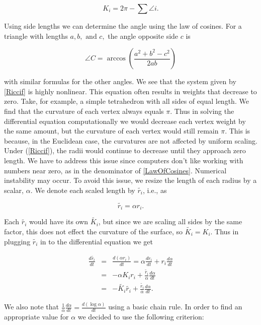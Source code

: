 \documentclass[12pt]{article}
\begin{document}
\begin{equation}
K_i = 2\pi - \sum{\angle i}.
\end{equation}

Using side lengths we can determine the angle using the law of cosines. For a triangle with lengths $a, b,\mbox{ and }c,$ the angle opposite side $c$ is
  
  \begin{equation}
  \label{LawOfCosines}
  \angle C = \arccos(\frac{a^2 + b^2 - c^2}{2ab})
  \end{equation}
  
 with similar formulas for the other angles. We see that the system given by \ref{Riccif} is highly nonlinear. This equation often results in weights that decrease to zero. Take, for example, a simple tetrahedron with all sides of equal length. We find that the curvature of each vertex always equals $\pi$. Thus in solving the differential equation computationally we would decrease each vertex weight by the same amount, but the curvature of each vertex would still remain $\pi.$ This is because, in the Euclidean case, the curvatures are not affected by uniform scaling. Under (\ref{Riccif}), the radii would continue to decrease until they approach zero length. We have to address this issue since computers don't like working with numbers near zero, as in the denominator of \ref{LawOfCosines}. Numerical instability may occur. To avoid this issue, we resize the length of each radius by a scalar, $\alpha$. We denote each scaled length by $\tilde{r_i}$, i.e., as
 
$$ \tilde{r_i} = \alpha r_i. $$ 
 
 Each $\tilde{r_i}$ would have its own $\tilde{K_i}$, but since we are scaling all sides by the same factor, this does not effect the curvature of the surface, so $\tilde{K_i} = K_i$. Thus in plugging $\tilde{r_i}$ in to the differential equation we get
 
 \begin{eqnarray}
 \label{ref1}
 \frac{d\tilde{r_i}}{dt} &=& \frac{d(\alpha r_i)}{dt} = \alpha \frac{dr_i}{dt} + r_i\frac{d\alpha}{dt}\nonumber\\
 &=& -\alpha K_ir_i + \frac{\tilde{r_i}}{\alpha}\frac{d\alpha}{dt} \nonumber \\
 &=& -\tilde{K_i}\tilde{r_i} + \frac{\tilde{r_i}}{\alpha}\frac{d\alpha}{dt}.
 \end{eqnarray}
 
 We also note that $\displaystyle \frac{1}{\alpha} \frac{d\alpha}{dt} = \frac{d(\log \alpha)}{dt}$ using a basic chain rule. In order to find an appropriate value for $\alpha$ we decided to use the following criterion:
 
\end{document}
